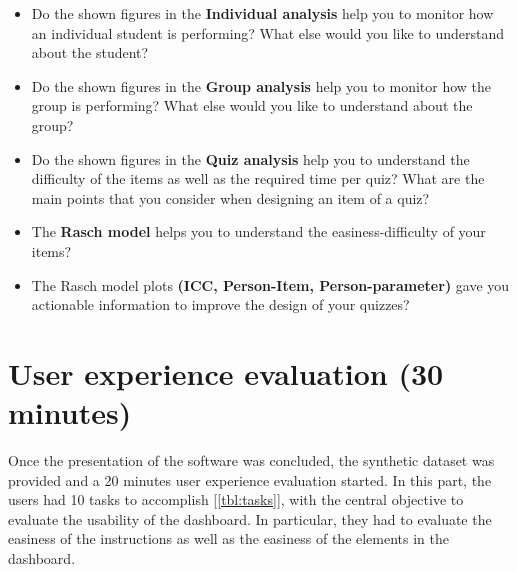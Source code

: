   \begin{itemize}
\item{Do the shown figures in the \textbf{Individual analysis} help you to monitor how an individual student is performing? What else would you like to understand about the student?}
\item{Do the shown figures in the \textbf{Group analysis} help you to monitor how the group is performing?  What else would you like to understand about the group?}
\item{Do the shown figures in the \textbf{Quiz analysis} help you to understand the difficulty of the items as well as the required time per quiz? What are the main points that you consider when designing an item of a quiz?}
\item{The \textbf{Rasch model} helps you to understand the easiness-difficulty of your items?}
\item{The Rasch model plots \textbf{(ICC, Person-Item, Person-parameter)} gave you actionable information to improve the design of your quizzes?}
\end{itemize}

\section{User experience evaluation (30 minutes)}

Once the presentation of the software was concluded, the synthetic dataset was provided and a 20 minutes user experience evaluation started. In this part, the users had 10 tasks to accomplish [\cref{tbl:tasks}], with the central objective to evaluate the usability of the dashboard. In particular, they had to evaluate the easiness of the instructions as well as the easiness of the elements in the dashboard.


